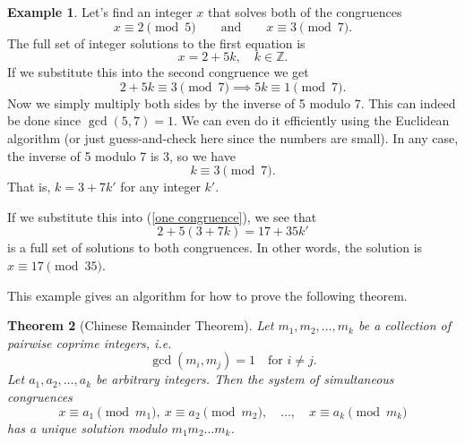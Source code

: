 \documentclass[12pt]{article}
\theoremstyle{plain}
\newtheorem{theorem}{Theorem}[section]
\theoremstyle{definition}
\newtheorem{example}[theorem]{Example}
\theoremstyle{remark}
\newcommand{\Z}{\mathbb{Z}}
\begin{document}
\begin{example}
    Let's find an integer $x$ that solves both of the congruences
    \[
        x \equiv 2 \pmod 5\qquad\text{and}\qquad x\equiv 3\pmod 7.
    \]
    The full set of integer solutions to the first equation is
    \begin{equation}\label{one congruence}
        x = 2 + 5k,\quad k\in \Z.
    \end{equation}
    If we substitute this into the second congruence we get
    \[
        2 + 5k \equiv 3\pmod 7 \implies 5k\equiv 1\pmod 7.
    \]
    Now we simply multiply both sides by the inverse of 5 modulo 7.
    This can indeed be done since $\gcd(5,7) = 1$.
    We can even do it efficiently using the Euclidean algorithm (or just guess-and-check here since the numbers are small).
    In any case, the inverse of 5 modulo 7 is 3, so we have
    \[
        k \equiv 3\pmod 7.
    \]
    That is, $k = 3 + 7k'$ for any integer $k'$.

    If we substitute this into (\ref{one congruence}), we see that
    \[
        2 + 5(3 + 7k) = 17 + 35k'
    \]
    is a full set of solutions to both congruences.
    In other words, the solution is $x\equiv 17\pmod{35}$.
\end{example}

This example gives an algorithm for how to prove the following theorem.

\begin{theorem}[Chinese Remainder Theorem]
    Let $m_1, m_2, \ldots, m_k$ be a collection of pairwise coprime integers, i.e.
    \[
        \gcd(m_i, m_j) = 1\quad\text{for }i\neq j.
    \]
    Let $a_1, a_2, \ldots, a_k$ be arbitrary integers.
    Then the system of simultaneous congruences
    \[
        x \equiv a_1\pmod{m_1},\ x\equiv a_2\pmod{m_2},\quad \ldots,\quad x \equiv a_k\pmod{m_k}
    \]
    has a unique solution modulo $m_1m_2\ldots m_k$.
\end{theorem}
\end{document}
